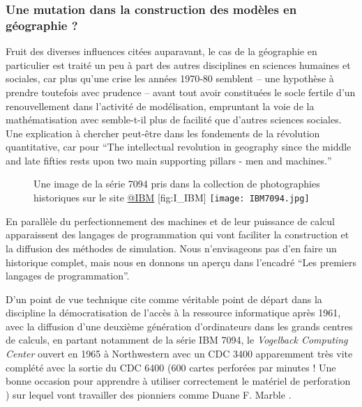 \subsubsection{Une mutation dans la construction des modèles en géographie ?}
\label{ssec:crise_mutation}

Fruit des diverses influences citées auparavant, le cas de la géographie en particulier est traité un peu à part des autres disciplines en sciences humaines et sociales, car plus qu'une crise les années 1970-80 semblent -- une hypothèse à prendre toutefois avec prudence -- avant tout avoir constituées le socle fertile d'un renouvellement dans l'activité de modélisation, empruntant la voie de la mathématisation avec semble-t-il plus de facilité que d'autres sciences sociales. Une explication à chercher peut-être dans les fondements de la révolution quantitative, car pour \textcite{Gould1970} \foreignquote{english}{The intellectual revolution in geography since the middle and late fifties rests upon two main supporting pillars - men and machines.}

\begin{figure}[htbp]
\begin{sidecaption}[fortoc]{Une image de la série 7094 pris dans la collection de photographies historiques sur le site \href{http://www-03.ibm.com/ibm/history/exhibits/mainframe/mainframe_album.html}{@IBM} }[fig:I_IBM]
  \centering
 \texttt{[image: IBM7094.jpg]}
  \end{sidecaption}
\end{figure}

En parallèle du perfectionnement des machines et de leur puissance de calcul apparaissent des langages de programmation qui vont faciliter la construction et la diffusion des méthodes de simulation. Nous n'envisageons pas d'en faire un historique complet, mais nous en donnons un aperçu dans l'encadré \enquote{Les premiers langages de programmation}.

D'un point de vue technique \textcite{Haggett1969} cite comme véritable point de départ dans la discipline la démocratisation de l'accès à la ressource informatique après 1961, avec la diffusion d'une deuxième génération d'ordinateurs dans les grands centres de calculs, en partant notamment de la série IBM 7094, le \textit{Vogelback Computing Center}  ouvert en 1965 à Northwestern avec un CDC 3400 apparemment très vite complété avec la sortie du CDC 6400 (600 cartes perforées par minutes ! Une bonne occasion pour apprendre à utiliser correctement le matériel de perforation \autocite{Fisk2005}) sur lequel vont travailler des pionniers comme Duane F. Marble . 

